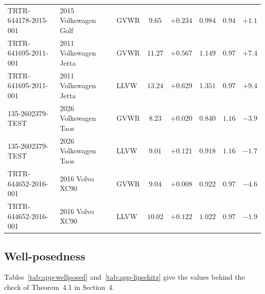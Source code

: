 \documentclass[12pt, twoside]{amsart}
\theoremstyle{definition}
\newcommand{\mainref}[2]{#2}
\begin{document}
{\begin{longtable}{lp{2.9cm}lccccc}
TRTR-644178-2015-001 & 2015 Volkswagen Golf & GVWR & $9.65$ & $+0.234$ & $0.984$ & $0.94$ & $+1.1$\\
TRTR-641695-2011-001 & 2011 Volkswagen Jetta & GVWR & $11.27$ & $+0.567$ & $1.149$ & $0.97$ & $+7.4$\\
TRTR-641695-2011-001 & 2011 Volkswagen Jetta & LLVW & $13.24$ & $+0.629$ & $1.351$ & $0.97$ & $+9.4$\\
135-2602379-TEST & 2026 Volkswagen Taos & GVWR & $8.23$ & $+0.020$ & $0.840$ & $1.16$ & $-3.9$\\
135-2602379-TEST & 2026 Volkswagen Taos & LLVW & $9.01$ & $+0.121$ & $0.918$ & $1.16$ & $-1.7$\\
TRTR-644652-2016-001 & 2016 Volvo XC90 & GVWR & $9.04$ & $+0.008$ & $0.922$ & $0.97$ & $-4.6$\\
TRTR-644652-2016-001 & 2016 Volvo XC90 & LLVW & $10.02$ & $+0.122$ & $1.022$ & $0.97$ & $-1.9$\\
\end{longtable}}
\FloatBarrier

\subsection{Well-posedness}

Tables~\ref{tab:app-wellposed} and~\ref{tab:app-lipschitz} give the values behind the check of
Theorem~\mainref{thm:wellposed}{4.1} in Section~\mainref{sec:wellposed}{4}.
\end{document}
